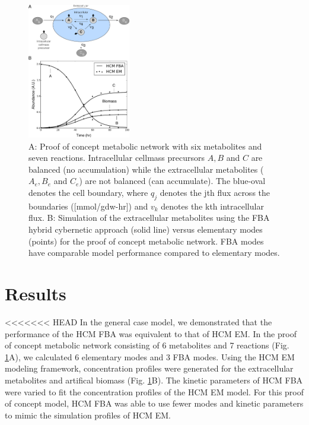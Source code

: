 \documentclass[10pt,twocolumn,twoside,final]{IEEEtran}
\begin{document}
\begin{figure}[!t]\centering
\includegraphics[width=0.40\textwidth]{./figs/Fig-1-GeneralModel-Results.pdf}
\caption{A: Proof of concept metabolic network with six metabolites and seven reactions.
Intracellular cellmass precursors $A,B$ and $C$ are balanced (no accumulation) while the extracellular metabolites ($A_{e},B_{e}$ and $C_{e}$) are not balanced (can accumulate). The blue-oval denotes the cell boundary, where $q_{j}$ denotes the jth flux across the boundaries ([mmol/gdw-hr]) and $v_{k}$ denotes the kth intracellular flux. B: Simulation of the extracellular metabolites using the FBA hybrid cybernetic approach (solid line) versus elementary modes (points) for the proof of concept metabolic network. FBA modes have comparable model performance compared to elementary modes.
}\label{fig:model-fitting}
\end{figure}

\section{Results}
<<<<<<< HEAD
In the general case model, we demonstrated that the performance of the HCM FBA was equivalent to that of HCM EM.
In the proof of concept metabolic network consisting of 6 metabolites and 7 reactions (Fig. \ref{fig:model-fitting}A), we calculated 6 elementary modes and 3 FBA modes.  
Using the HCM EM modeling framework, concentration profiles were generated for the extracellular metabolites and artifical biomass (Fig. \ref {fig:model-fitting}B). 
The kinetic parameters of HCM FBA were varied to fit the concentration profiles of the HCM EM model. 
For this proof of concept model, HCM FBA was able to use fewer modes and kinetic parameters to mimic the simulation profiles of HCM EM.
\end{document}
